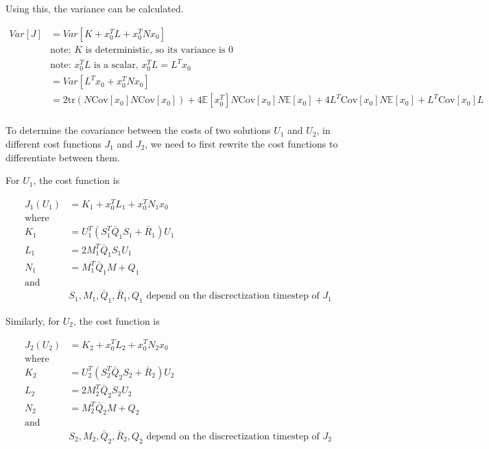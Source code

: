 \documentclass{article}
\begin{document}
Using this, the variance can be calculated.

\begin{equation}
  \begin{aligned}
    Var[J] &= Var[K + x_0^T L + x_0^T N x_0] \\
    &\text{note: $K$ is deterministic, so its variance is 0} \\
    & \text{note: $x_0^T L$ is a scalar, $x_0^T L = L^T x_0$} \\
    &= Var[L^T x_0 + x_0^T N x_0] \\
    &= 2\text{tr}(N \text{Cov}[x_0] N \text{Cov}[x_0]) + 4 \mathbb{E}[x_0^T]N\text{Cov}[x_0]N\mathbb{E}[x_0] + 4 L^T \text{Cov}[x_0] N \mathbb{E}[x_0] + L^T \text{Cov}[x_0] L \\
  \end{aligned}
\end{equation}

To determine the covariance between the costs of two solutions $U_1$ and $U_2$, in different cost functions
$J_1$ and $J_2$, we need to first rewrite the cost functions to differentiate between them.

For $U_1$, the cost function is

$$
\begin{aligned}
  J_1(U_1) &= K_1 + x_0^T L_1 + x_0^T N_1 x_0 \\
  \text{where} \\
  K_1 &= U_1^T(S_1^T \bar{Q}_1 S_1 + \bar{R}_1) U_1 \\
  L_1 &= 2 M_1^T \bar{Q}_1 S_1 U_1 \\
  N_1 &= M_1^T \bar{Q}_1 M + Q_1 \\
  \text{and} \\
  & S_1, M_1, \bar{Q}_1, \bar{R}_1, Q_1 \text{ depend on the discrectization timestep of } J_1
\end{aligned}
$$

Similarly, for $U_2$, the cost function is

$$
\begin{aligned}
  J_2(U_2) &= K_2 + x_0^T L_2 + x_0^T N_2 x_0 \\
  \text{where} \\
  K_2 &= U_2^T(S_2^T \bar{Q}_2 S_2 + \bar{R}_2) U_2 \\
  L_2 &= 2 M_2^T \bar{Q}_2 S_2 U_2 \\
  N_2 &= M_2^T \bar{Q}_2 M + Q_2 \\
  \text{and} \\
  & S_2, M_2, \bar{Q}_2, \bar{R}_2, Q_2 \text{ depend on the discrectization timestep of } J_2
\end{aligned}
$$
\end{document}
